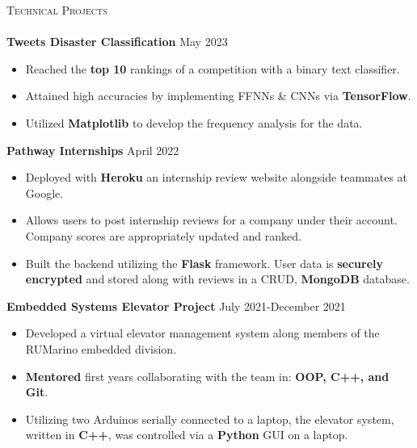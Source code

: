 \documentclass[a4paper]{article}
\newcommand{\lineunder} {
    \vspace*{-8pt} \\
    \hspace*{-18pt} \hrulefill \\
}
\newcommand{\header} [1] {
    {\hspace*{-18pt}\vspace*{6pt} \textsc{#1}}
    \vspace*{-6pt} \lineunder
}
\begin{document}
\header{Technical Projects}
{\textbf{Tweets Disaster Classification}} \hfill May 2023 \\
\vspace{-2mm}
\begin{itemize} \itemsep -1pt
\item Reached the \textbf{top 10} rankings of a competition with a binary text classifier. 

\item Attained high accuracies by implementing FFNNs \& CNNs via \textbf{TensorFlow}.

\item Utilized \textbf{Matplotlib} to develop the frequency analysis for the data.
\end{itemize}
\vspace{-2mm}

{\textbf{Pathway Internships}} \hfill April 2022 \\
\vspace{-2mm}
\begin{itemize} \itemsep -1pt
\item Deployed with \textbf{Heroku} an internship review website alongside teammates at Google.

\item Allows users to post internship reviews for a company under their account. Company scores are appropriately updated and ranked.

\item Built the backend utilizing the \textbf{Flask} framework. User data is \textbf{securely encrypted} and stored along with reviews in a CRUD, \textbf{MongoDB} database. 
\end{itemize}

{\textbf{Embedded Systems Elevator Project}} \hfill \hfill July 2021-December 2021\\
\vspace{-2mm}

\begin{itemize} \itemsep -1pt
\item Developed a virtual elevator management system along members of the RUMarino embedded division.

\item \textbf{Mentored} first years collaborating with the team in: \textbf{OOP, C++, and Git}.

\item Utilizing two Arduinos serially connected to a laptop, the elevator system, written in \textbf{C++}, was controlled via a \textbf{Python} GUI on a laptop.\\
\end{itemize}
\vspace*{-0.5mm}
\end{document}

